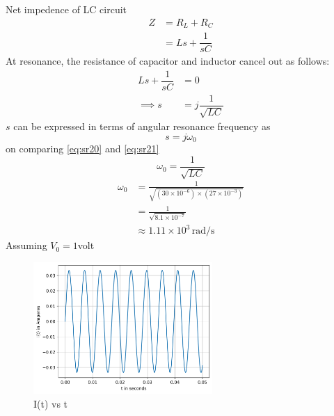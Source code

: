 \documentclass[journal,12pt,twocolumn]{IEEEtran}
\theoremstyle{remark}
\begin{document}
Net impedence of LC circuit \\
\begin{align}
Z&=R_L +R_C \\
&=Ls + \dfrac{1}{sC} 
\end{align}
At resonance, the resistance of capacitor and inductor cancel out as follows:
\begin{align}
    Ls + \dfrac{1}{sC} &= 0\\
    \implies s &= j\dfrac{1}{\sqrt{LC}} \label{eq:sr20}
\end{align}
$s$ can be expressed in terms of angular resonance frequency as
\begin{equation}
    s = j\omega_0 \label{eq:sr21}
\end{equation}
on comparing \eqref{eq:sr20} and \eqref{eq:sr21}
\begin{equation}
    \omega_0 = \dfrac{1}{\sqrt{LC}}
\end{equation}
\begin{align}
\omega_0 &= \frac{1}{\sqrt{(30 \times 10^{-6}) \times (27 \times 10^{-3})}} \\
&= \frac{1}{\sqrt{8.1 \times 10^{-7}}}\\
& \approx 1.11 \times 10^{3} \, \text{rad/s}
\end{align}
Assuming $V_0=1$volt\\
\begin{figure}[h!]
    \centering
    \includegraphics[width=\columnwidth,height=5cm]{ncert-physics/12/7/7/figs/p.png}
    \caption{I(t) vs t}
    \label{fig:sr31}
\end{figure}
\end{document}
